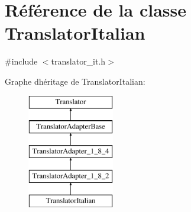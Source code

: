\hypertarget{class_translator_italian}{}\section{Référence de la classe Translator\+Italian}
\label{class_translator_italian}


{\ttfamily \#include $<$translator\+\_\+it.\+h$>$}

Graphe d\textquotesingle{}héritage de Translator\+Italian\+:\begin{figure}[H]
\begin{center}
\leavevmode
\includegraphics[height=5.000000cm]{class_translator_italian}
\end{center}
\end{figure}

